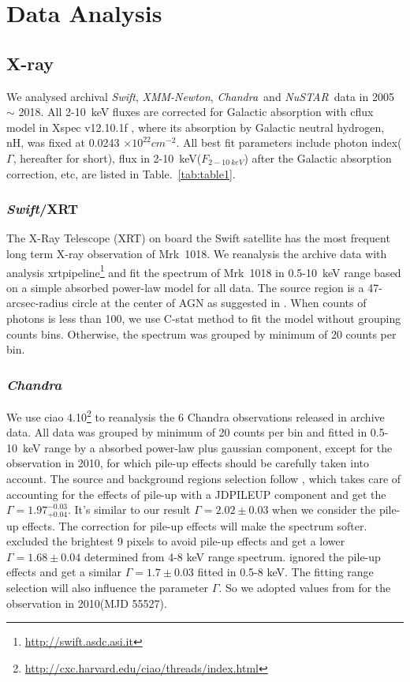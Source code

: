 \documentclass{aastex63}
\newcommand{\xmm}{{\em XMM-Newton}}
\newcommand{\nustar}{{\em NuSTAR}}
\newcommand{\chandra}{{\em Chandra}}
\newcommand{\swift}{{\em Swift}}
\begin{document}
\section{Data Analysis}\label{sec:data}
\subsection{X-ray}
We analysed archival \swift, \xmm, \chandra~and \nustar~data in 2005 $\sim$ 2018. All 2-10~keV fluxes are corrected for Galactic absorption with cflux model in Xspec v12.10.1f \citep{1996ASPC..101...17A}, where its absorption by Galactic neutral hydrogen, nH, was fixed at 0.0243 $\times 10^{22} cm^{-2}$\citep[see ][]{2016A&A...593L...9H}. All best fit parameters include photon index($\Gamma$, hereafter for short), flux in 2-10~keV($F_{2-10~keV}$) after the Galactic absorption correction, etc, are listed in Table.~\ref{tab:table1}.



\subsubsection{\swift/XRT}
The X-Ray Telescope (XRT) on board the Swift satellite has the most frequent long term X-ray observation of Mrk~1018. We reanalysis the archive data with analysis xrtpipeline\footnote{\url{http://swift.asdc.asi.it}} and fit the spectrum of Mrk~1018 in 0.5-10~keV range based on a simple absorbed power-law model for all data.  The source region is a 47-arcsec-radius circle at the center of AGN as suggested in \citet{2009MNRAS.397.1177E}. When counts of photons is less than 100, we use C-stat method to fit the model without grouping counts bins. Otherwise, the spectrum was grouped by minimum of 20 counts per bin. 


\subsubsection{\chandra}
We use ciao 4.10\footnote{\url{http://cxc.harvard.edu/ciao/threads/index.html}} to reanalysis the 6 Chandra observations released in archive data. All data was grouped by minimum of 20 counts per bin and fitted in 0.5-10~keV range by a absorbed power-law plus gaussian component, except for the observation in 2010, for which pile-up effects should be carefully taken into account. The source and background regions selection follow \citet{2017ApJ...840...11L}, which takes care of accounting for the effects of pile-up with a JDPILEUP component and get the  $\Gamma =1.97_{+0.04}^{-0.03}$. It's similar to our result $\Gamma =2.02\pm{0.03}$ when we consider the pile-up effects. The correction for pile-up effects will make the spectrum softer. \citet{2016A&A...593L...9H} excluded the brightest 9 pixels to avoid pile-up effects and get a lower $\Gamma =1.68\pm0.04$ determined from 4-8 keV range spectrum. \citet{2017A&A...607L...9K} ignored the pile-up effects and get a similar $\Gamma =1.7\pm0.03$ fitted in 0.5-8 keV. The fitting range selection will also influence the parameter $\Gamma$. So we adopted values from \citet{2017A&A...607L...9K} for the observation in 2010(MJD 55527).
\end{document}
